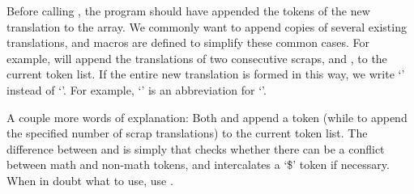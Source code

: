 Before calling , the program should have appended the tokens of
the new translation to the  array. We commonly want to append
copies of several existing translations, and macros are defined to
simplify these common cases. For example,  will
append the
translations of two consecutive scraps,  and , to
the current token list. If the entire new translation is formed in this
way, we write `' instead of `'. For
example, `' is an
abbreviation for `'.

A couple more words of explanation:
Both  and  append a token (while  to 
append the specified number of scrap translations) to the current token list.
The difference between  and  is simply that 
checks whether there can be a conflict between math and non-math
tokens, and intercalates a `\.{\$}' token if necessary.  When in
doubt what to use, use .

